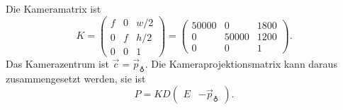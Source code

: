 \begin{loesung}
Die Kameramatrix ist
\[
K 
=
\begin{pmatrix}
f&0&w/2\\
0&f&h/2\\
0&0& 1
\end{pmatrix}
=
\begin{pmatrix}
50000 &   0   & 1800 \\
  0   & 50000 & 1200 \\
  0   &   0   &  1
\end{pmatrix}.
\]
Das Kamerazentrum ist $\vec{c} = \vec{p}_{\earth}$. 
Die Kameraprojektionsmatrix kann daraus zusammengesetzt werden, sie ist
\[
P = K D \begin{pmatrix} E & -\vec{p}_{\earth} \end{pmatrix}.
\]


\end{loesung}
